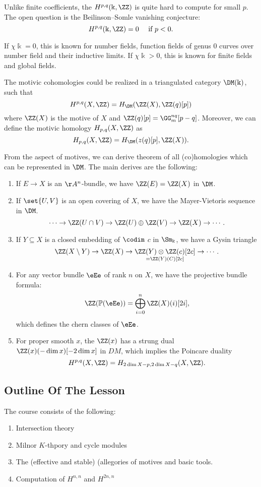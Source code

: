 Unlike finite coefficients, the $H^{p,q}(\Bbbk, \ZZ)$ is quite hard to compute for small
$p$. The open question is the Beilinson--Somle vanishing conjecture: $$ H^{p, q}(\Bbbk,
\ZZ)=0\quad \text { if } p<0. $$

If $\chi\Bbbk=0$, this is known for number fields, function fields of genus $0$ curves
over number field and their inductive limits. If $\chi\Bbbk>0$, this is known for finite
fields and global fields.

The motivic cohomologies could be realized in a triangulated category $\DM(\Bbbk)$, such
that $$ H^{p, q}(X, \ZZ)=H_{\DM}(\ZZ(X), \ZZ(q)[p]) $$ where $\ZZ(X)$ is the motive of
$X$ and $\ZZ(q)[p]=\GG_m^{n q}[p-q]$. Moreover, we can define the motivic homology $H_{p,
		q}(X, \ZZ)$ as $$ H_{p, q}(X, \ZZ)=H_{\DM}(z(q)[p], \ZZ(X)). $$

From the aspect of motives, we can derive theorem of all (co)homologies which can be
represented in $\DM$. The main derives are the following:
\begin{enumerate}
	\item
			If $E \rightarrow X$ is an $\AA^n$-bundle, we have $\ZZ(E)=\ZZ(X)$ in $\DM$.
	\item
			If $\set{U, V}$ is an open covering of $X$, we have the Mayer-Vietoris sequence in $\DM$. $$ \cdots
			\rightarrow \ZZ(U \cap V) \rightarrow \ZZ(U) \oplus \ZZ(V) \rightarrow \ZZ(X) \rightarrow \cdots.
			$$
	\item
			If $Y \subseteq X$ is a closed embedding of $\codim$ $c$ in $\Sm_{\Bbbk}$, we have a Gysin triangle
			$$ \ZZ(X \setminus Y) \rightarrow \ZZ(X) \rightarrow \underset{=\ZZ(Y)(C)[2c]}{\ZZ(Y) \otimes
				\ZZ(c)[2c]} \rightarrow \cdots. $$
	\item
			For any vector bundle $\eEe$ of rank $n$ on $X$, we have the projective bundle formula: $$
			\ZZ(\mathbb{P}(\eEe))=\bigoplus_{i=0}^n \ZZ(X)(i)[2 i], $$ which defines the chern classes of
			$\eEe$.
	\item
			For proper smooth $x$, the $\ZZ(x)$ has a strung dual $\ZZ(x)(-\dim x)[-2 \dim x]$ in $D M$, which
			implies the Poincare duality $$ H^{p, q}(X, \ZZ)=H_{2 \dim X-p, 2 \dim X-q}(X, \ZZ). $$
\end{enumerate}

\subsection{Outline Of The Lesson}

The course consists of the following:
\begin{enumerate}
	\item
			Intersection theory
	\item
			Milnor $K$-thpory and cycle modules
	\item
			The (effective and stable) (allegories of motives and basic tools.
	\item
			Computation of $H^{n, n}$ and $H^{2 n, n}$
\end{enumerate}